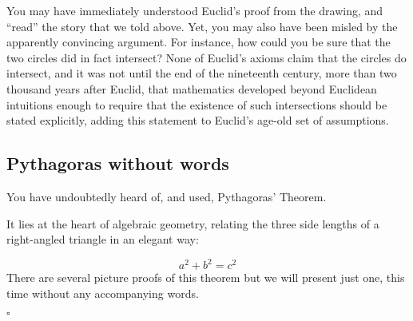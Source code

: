 You may have immediately understood Euclid's proof from the drawing,
and ``read'' the story that we told above.
Yet, you may also have been misled by the apparently convincing argument.
For instance, how could you be sure that the two circles did in fact intersect?
None of Euclid's axioms claim that the circles do intersect,
and it was not until the end of the nineteenth century,
more than two thousand years after Euclid,
that mathematics developed beyond Euclidean intuitions
enough to require that the existence of such intersections should be stated explicitly,
adding this statement to Euclid's age-old set of assumptions.

\medskip

\subsection*{Pythagoras without words}
\noindent
You have undoubtedly heard of, and used, Pythagoras' Theorem.
\begin{center}
\end{center}
It lies at the heart of algebraic geometry,
relating the three side lengths of a right-angled triangle in an elegant way:

\medskip
{}
\[
  a^2 + b^2 = c^2
\]
There are several picture proofs of this theorem
but we will present just one, this time without any accompanying words.


\medskip
{}

\begin{center}
\end{center}
\hfill$\square$

